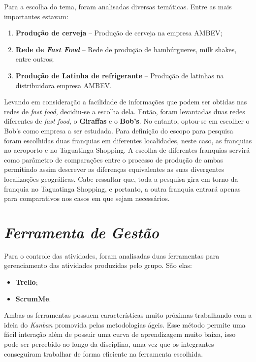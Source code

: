 		Para a escolha do tema, foram analisadas diversas temáticas. Entre as mais importantes estavam:

		\begin{enumerate}
			\item{\textbf{Produção de cerveja} – Produção de cerveja na empresa AMBEV;}
			\item{\textbf{Rede de \emph{Fast Food}} – Rede de produção de hambúrgueres, milk shakes, entre outros;}
			\item{\textbf{Produção de Latinha de refrigerante} – Produção de latinhas na distribuidora empresa AMBEV.}
		\end{enumerate}

		Levando em consideração a facilidade de informações que podem ser obtidas nas redes de \emph{fast food}, decidiu-se a escolha dela. Então, foram levantadas duas redes diferentes de \emph{fast food}, o \textbf{Giraffas} e o \textbf{Bob’s}. No entanto, optou-se em escolher o Bob's como empresa a ser estudada. Para definição do escopo para pesquisa foram escolhidas duas franquias em diferentes localidades, neste caso, as franquias no aeroporto e no Taguatinga Shopping. A escolha de diferentes franquias servirá como parâmetro de comparações entre o processo de produção de ambas permitindo assim descrever as diferenças equivalentes as suas divergentes localizações geográficas. Cabe ressaltar que, toda a pesquisa gira em torno da franquia no Taguatinga Shopping, e portanto, a outra franquia entrará apenas para comparativos nos casos em que sejam necessários. 

	\section[Ferramenta de Gestão]{\emph{Ferramenta de Gestão}}
	\label{sec:informacoesGerais_ferramenta}

		Para o controle das atividades, foram analisadas duas ferramentas para gerenciamento das atividades produzidas pelo grupo. São elas:

		\begin{itemize}
			\item{\textbf{Trello};}
			\item{\textbf{ScrumMe}.}
		\end{itemize}

		Ambas as ferramentas possuem características muito próximas trabalhando com a ideia do \emph{Kanban} promovida pelas metodologias ágeis. Esse método permite uma fácil interação além de possuir uma curva de aprendizagem muito baixa, isso pode ser percebido ao longo da disciplina, uma vez que os integrantes conseguiram trabalhar de forma eficiente na ferramenta escolhida.

